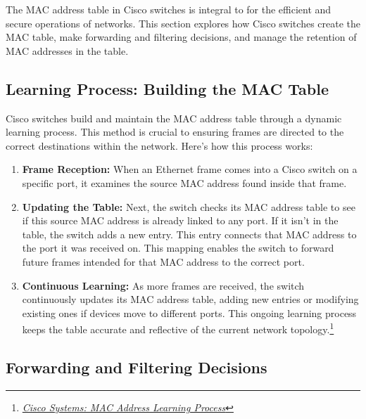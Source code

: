 \documentclass[11pt,a4paper]{article}
\begin{document}
The MAC address table in Cisco switches is integral to for the efficient and secure operations of networks. This section explores how Cisco switches create the MAC table, make forwarding and filtering decisions, and manage the retention of MAC addresses in the table.


\subsection*{Learning Process: Building the MAC Table}

Cisco switches build and maintain the MAC address table through a dynamic learning process. This method is crucial to ensuring frames are directed to the correct destinations within the network. Here’s how this process works:

\begin{enumerate}
    
    \item \textbf{Frame Reception:} When an Ethernet frame comes into a Cisco switch on a specific port, it examines the source MAC address found inside that frame.

    \item \textbf{Updating the Table:} Next, the switch checks its MAC address table to see if this source MAC address is already linked to any port. If it isn’t in the table, the switch adds a new entry. This entry connects that MAC address to the port it was received on. This mapping enables the switch to forward future frames intended for that MAC address to the correct port.

    \item \textbf{Continuous Learning:} As more frames are received, the switch continuously updates its MAC address table, adding new entries or modifying existing ones if devices move to different ports. This ongoing learning process keeps the table accurate and reflective of the current network topology.\footnote{\href{https://learningnetwork.cisco.com/s/article/mac-address-learing-pdf}{\textit{Cisco Systems: MAC Address Learning Process}}}

\end{enumerate}


\subsection*{Forwarding and Filtering Decisions}
\end{document}
